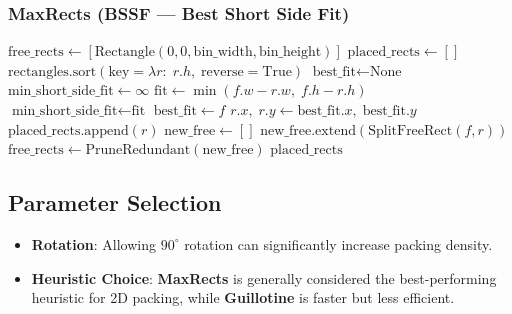 \subsubsection*{MaxRects (BSSF --- Best Short Side Fit)}
\begin{algorithm}[ht]
\label{alg:maxrects}
\begin{algorithmic}[1]
    \State $\text{free\_rects} \gets [\text{Rectangle}(0, 0, \text{bin\_width}, \text{bin\_height})]$
    \State $\text{placed\_rects} \gets []$
    \State $\text{rectangles}.\text{sort}(\text{key}=\lambda r{:}\; r.h,\; \text{reverse}=\text{True})$
        \State $\text{best\_fit} \gets \text{None}$
        \State $\text{min\_short\_side\_fit} \gets \infty$
                \State $\text{fit} \gets \min(f.w - r.w,\; f.h - r.h)$
                    \State $\text{min\_short\_side\_fit} \gets \text{fit}$
                    \State $\text{best\_fit} \gets f$
                \EndIf
            \EndIf
        \EndFor
            \State $r.x,\; r.y \gets \text{best\_fit}.x,\; \text{best\_fit}.y$
            \State $\text{placed\_rects}.\text{append}(r)$
            \State $\text{new\_free} \gets []$
                \State $\text{new\_free}.\text{extend}(\text{SplitFreeRect}(f, r))$
            \EndFor
            \State $\text{free\_rects} \gets \text{PruneRedundant}(\text{new\_free})$
        \EndIf
    \EndFor
    \State \Return $\text{placed\_rects}$
\EndFunction
\end{algorithmic}
\end{algorithm}

\subsection{Parameter Selection}
\begin{itemize}
    \item \textbf{Rotation}: Allowing $90^\circ$ rotation can significantly increase packing density.
    \item \textbf{Heuristic Choice}: \textbf{MaxRects} is generally considered the best-performing heuristic for 2D packing, while \textbf{Guillotine} is faster but less efficient.
\end{itemize}

